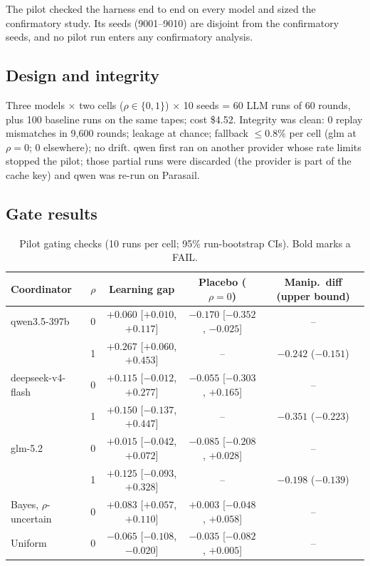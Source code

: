 \documentclass[11pt,letterpaper]{article}
\numberwithin{equation}{section}
\numberwithin{table}{section}
\numberwithin{figure}{section}
\numberwithin{algorithm}{section}
\begin{document}
The pilot checked the harness end to end on every model and sized the confirmatory study. Its seeds (9001--9010) are disjoint from the confirmatory seeds, and no pilot run enters any confirmatory analysis.

\subsection{Design and integrity}

Three models $\times$ two cells ($\rho\in\{0,1\}$) $\times$ 10 seeds = 60 LLM runs of 60 rounds, plus 100 baseline runs on the same tapes; cost \$4.52. Integrity was clean: 0 replay mismatches in 9{,}600 rounds; leakage at chance; fallback $\le0.8\%$ per cell (glm at $\rho=0$; 0 elsewhere); no drift. qwen first ran on another provider whose rate limits stopped the pilot; those partial runs were discarded (the provider is part of the cache key) and qwen was re-run on Parasail.

\subsection{Gate results}

\begin{table}[h]
\centering\small
\caption{Pilot gating checks (10 runs per cell; 95\% run-bootstrap CIs). Bold marks a FAIL.}
\label{tab:pilotgate}
\begin{adjustbox}{max width=\linewidth}
\begin{tabular}{llccc}
\toprule
Coordinator & $\rho$ & Learning gap & Placebo ($\rho=0$) & Manip.\ diff (upper bound) \\
\midrule
qwen3.5-397b & 0 & $+0.060$ [$+0.010$, $+0.117$] & $\mathbf{-0.170}$ [$-0.352$, $-0.025$] & -- \\
 & 1 & $+0.267$ [$+0.060$, $+0.453$] & -- & $-0.242$ ($-0.151$) \\
deepseek-v4-flash & 0 & $\mathbf{+0.115}$ [$-0.012$, $+0.277$] & $-0.055$ [$-0.303$, $+0.165$] & -- \\
 & 1 & $\mathbf{+0.150}$ [$-0.137$, $+0.447$] & -- & $-0.351$ ($-0.223$) \\
glm-5.2 & 0 & $\mathbf{+0.015}$ [$-0.042$, $+0.072$] & $-0.085$ [$-0.208$, $+0.028$] & -- \\
 & 1 & $\mathbf{+0.125}$ [$-0.093$, $+0.328$] & -- & $-0.198$ ($-0.139$) \\
\addlinespace
Bayes, $\rho$-uncertain & 0 & $+0.083$ [$+0.057$, $+0.110$] & $+0.003$ [$-0.048$, $+0.058$] & -- \\
Uniform & 0 & $\mathbf{-0.065}$ [$-0.108$, $-0.020$] & $-0.035$ [$-0.082$, $+0.005$] & -- \\
\bottomrule
\end{tabular}
\end{adjustbox}
\end{table}
\end{document}
